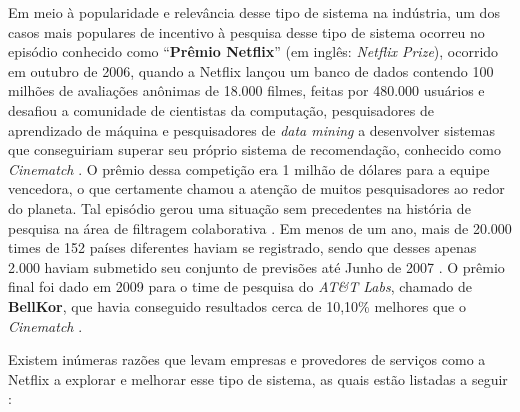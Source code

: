 \documentclass[
	12pt,				%
	a4paper,			%
	english,			%
	french,				%
	spanish,			%
	brazil				%
	]{abntex2}
\begin{document}
Em meio à popularidade e relevância desse tipo de sistema na indústria, um dos casos mais populares de incentivo à pesquisa desse tipo de sistema ocorreu no episódio conhecido como ``\textbf{Prêmio Netflix}'' (em inglês: \emph{Netflix Prize}), ocorrido em outubro de 2006, quando a Netflix \cite{netflix} lançou um banco de dados contendo 100 milhões de avaliações anônimas de 18.000 filmes, feitas por 480.000 usuários e desafiou a comunidade de cientistas da computação, pesquisadores de aprendizado de máquina e pesquisadores de \emph{data mining} a desenvolver sistemas que conseguiriam superar seu próprio sistema de recomendação, conhecido como \emph{Cinematch} \cite{bennett2007netflix}. O prêmio dessa competição era 1 milhão de dólares para a equipe vencedora, o que certamente chamou a atenção de muitos pesquisadores ao redor do planeta. Tal episódio gerou uma situação sem precedentes na história de pesquisa na área de filtragem colaborativa \cite{bell2007lessons}. Em menos de um ano, mais de 20.000 times de 152 países diferentes haviam se registrado, sendo que desses apenas 2.000 haviam submetido seu conjunto de previsões até Junho de 2007 \cite{bennett2007netflix}. O prêmio final foi dado em 2009 para o time de pesquisa do \emph{AT\&T Labs}, chamado de \textbf{BellKor}, que havia conseguido resultados cerca de 10,10\% melhores que o \emph{Cinematch} \cite{koren2009bellkor}.

Existem inúmeras razões que levam empresas e provedores de serviços como a Netflix a explorar e melhorar esse tipo de sistema, as quais estão listadas a seguir \cite{ricci2011introduction}:
\end{document}
